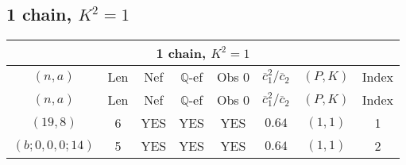 \subsection{1 chain, $K^2 = 1$}
\begin{longtable}{|c|c|c|c|c|c|c|c|}
\hline
\multicolumn{8}{|c|}{1 chain, $K^2 = 1$}\\
\hline
$(n,a)$ & Len & Nef & $\mathbb Q$-ef & Obs 0 & $\overline c_1^2 / \overline c_2$ & $(P,K)$ & Index\\
\hline
\endfirsthead

\hline
$(n,a)$ & Len & Nef & $\mathbb Q$-ef & Obs 0 & $\overline c_1^2 / \overline c_2$ & $(P,K)$ & Index\\
\hline
\endhead
\hline
\endfoot

$(19,8)$ & 6 & YES & YES & YES & $0.64$ & $(1,1)$ & 1\\
$(b;0,0,0;14)$ & 5 & YES & YES & YES & $0.64$ & $(1,1)$ & 2
\end{longtable}
